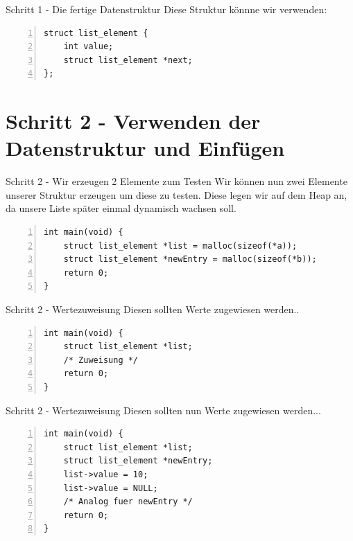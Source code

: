 \begin{frame}[fragile]{Schritt 1 - Die fertige Datenstruktur}
Diese Struktur könnne wir verwenden:\\
\bigskip
\begin{lstlisting}[numbers=left]
struct list_element {
    int value;
    struct list_element *next;
};
\end{lstlisting}
\end{frame}


\section{Schritt 2 - Verwenden der Datenstruktur und Einfügen}

\begin{frame}[fragile]{Schritt 2 - Wir erzeugen 2 Elemente zum Testen}
Wir können nun zwei Elemente unserer Struktur erzeugen um diese zu testen. Diese legen wir auf dem Heap an, da unsere Liste später einmal dynamisch wachsen soll.
\bigskip
\begin{lstlisting}[numbers=left]
int main(void) {
    struct list_element *list = malloc(sizeof(*a));
    struct list_element *newEntry = malloc(sizeof(*b));
    return 0;
}
\end{lstlisting}
\end{frame}


\begin{frame}[fragile]{Schritt 2 - Wertezuweisung}
Diesen sollten Werte zugewiesen werden..
\bigskip
\begin{lstlisting}[numbers=left]
int main(void) {
    struct list_element *list;
    /* Zuweisung */
    return 0;
}
\end{lstlisting}

\end{frame}

\begin{frame}[fragile]{Schritt 2 - Wertezuweisung}
Diesen sollten nun Werte zugewiesen werden...
\bigskip
\begin{lstlisting}[numbers=left]
int main(void) {
    struct list_element *list;
    struct list_element *newEntry;
    list->value = 10;
    list->value = NULL;
    /* Analog fuer newEntry */
    return 0;
}
\end{lstlisting}

\end{frame}

